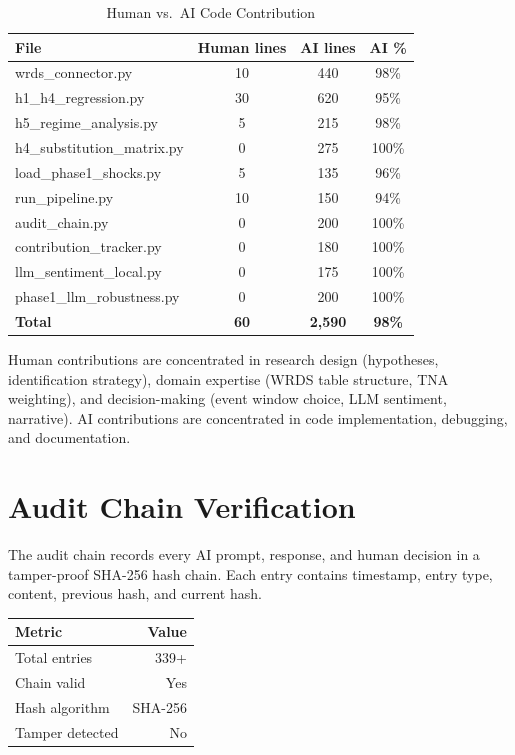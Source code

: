 \documentclass[11pt,a4paper]{article}
\begin{document}
\begin{table}[H]
\centering
\caption{Human vs.\ AI Code Contribution}
\label{tab:contribution}
\begin{tabular}{lccc}
\toprule
File & Human lines & AI lines & AI \% \\
\midrule
wrds\_connector.py & 10 & 440 & 98\% \\
h1\_h4\_regression.py & 30 & 620 & 95\% \\
h5\_regime\_analysis.py & 5 & 215 & 98\% \\
h4\_substitution\_matrix.py & 0 & 275 & 100\% \\
load\_phase1\_shocks.py & 5 & 135 & 96\% \\
run\_pipeline.py & 10 & 150 & 94\% \\
audit\_chain.py & 0 & 200 & 100\% \\
contribution\_tracker.py & 0 & 180 & 100\% \\
llm\_sentiment\_local.py & 0 & 175 & 100\% \\
phase1\_llm\_robustness.py & 0 & 200 & 100\% \\
\midrule
\textbf{Total} & \textbf{60} & \textbf{2,590} & \textbf{98\%} \\
\bottomrule
\end{tabular}
\end{table}

Human contributions are concentrated in research design (hypotheses, identification strategy), domain expertise (WRDS table structure, TNA weighting), and decision-making (event window choice, LLM sentiment, narrative). AI contributions are concentrated in code implementation, debugging, and documentation.

\section{Audit Chain Verification}
\label{app:audit}

The audit chain records every AI prompt, response, and human decision in a tamper-proof SHA-256 hash chain. Each entry contains timestamp, entry type, content, previous hash, and current hash.

\begin{table}[H]
\centering
\begin{tabular}{lr}
\toprule
Metric & Value \\
\midrule
Total entries & 339+ \\
Chain valid & Yes \\
Hash algorithm & SHA-256 \\
Tamper detected & No \\
\bottomrule
\end{tabular}
\end{table}
\end{document}
